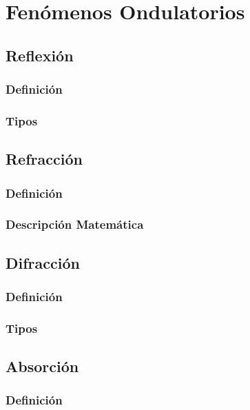 \chapter{Fenómenos Ondulatorios}%
\section{Reflexión}%
\subsection{Definición}

\subsection{Tipos}

\section{Refracción}
\subsection{Definición}

\subsection{Descripción Matemática}

\section{Difracción}
\subsection{Definición}

\subsection{Tipos}

\section{Absorción}
\subsection{Definición}

